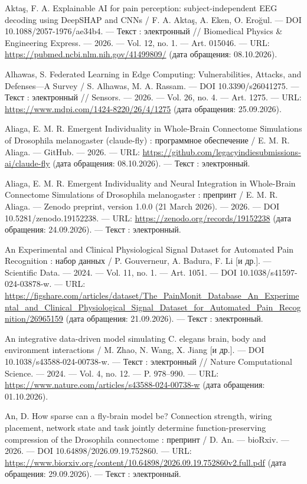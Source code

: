 \begin{list}{}{\setlength{\leftmargin}{10mm}\setlength{\labelwidth}{8mm}\setlength{\labelsep}{2mm}\setlength{\itemsep}{0pt}\setlength{\parsep}{0pt}\setlength{\topsep}{0pt}}
\item[28.] Aktaş, F. A. Explainable AI for pain perception: subject-independent EEG decoding using DeepSHAP and CNNs / F. A. Aktaş, A. Eken, O. Eroğul. — DOI 10.1088/2057-1976/ae34b4. — Текст : электронный // Biomedical Physics \& Engineering Express. — 2026. — Vol. 12, no. 1. — Art. 015046. — URL: \url{https://pubmed.ncbi.nlm.nih.gov/41499809/} (дата обращения: 08.10.2026).
\item[29.] Alhawas, S. Federated Learning in Edge Computing: Vulnerabilities, Attacks, and Defenses—A Survey / S. Alhawas, M. A. Rassam. — DOI 10.3390/s26041275. — Текст : электронный // Sensors. — 2026. — Vol. 26, no. 4. — Art. 1275. — URL: \url{https://www.mdpi.com/1424-8220/26/4/1275} (дата обращения: 25.09.2026).
\item[30.] Aliaga, E. M. R. Emergent Individuality in Whole-Brain Connectome Simulations of Drosophila melanogaster (claude-fly) : программное обеспечение / E. M. R. Aliaga. — GitHub. — 2026. — URL: \url{https://github.com/legacyindiesubmissions-ai/claude-fly} (дата обращения: 08.10.2026). — Текст : электронный.
\item[31.] Aliaga, E. M. R. Emergent Individuality and Neural Integration in Whole-Brain Connectome Simulations of Drosophila melanogaster : препринт / E. M. R. Aliaga. — Zenodo preprint, version 1.0.0 (21 March 2026). — 2026. — DOI 10.5281/zenodo.19152238. — URL: \url{https://zenodo.org/records/19152238} (дата обращения: 24.09.2026). — Текст : электронный.
\item[32.] An Experimental and Clinical Physiological Signal Dataset for Automated Pain Recognition : набор данных / P. Gouverneur, A. Badura, F. Li [и др.]. — Scientific Data. — 2024. — Vol. 11, no. 1. — Art. 1051. — DOI 10.1038/s41597-024-03878-w. — URL: \url{https://figshare.com/articles/dataset/The\_PainMonit\_Database\_An\_Experimental\_and\_Clinical\_Physiological\_Signal\_Dataset\_for\_Automated\_Pain\_Recognition/26965159} (дата обращения: 21.09.2026). — Текст : электронный.
\item[33.] An integrative data-driven model simulating C. elegans brain, body and environment interactions / M. Zhao, N. Wang, X. Jiang [и др.]. — DOI 10.1038/s43588-024-00738-w. — Текст : электронный // Nature Computational Science. — 2024. — Vol. 4, no. 12. — P. 978–990. — URL: \url{https://www.nature.com/articles/s43588-024-00738-w} (дата обращения: 01.10.2026).
\item[34.] An, D. How sparse can a fly-brain model be? Connection strength, wiring placement, network state and task jointly determine function-preserving compression of the Drosophila connectome : препринт / D. An. — bioRxiv. — 2026. — DOI 10.64898/2026.09.19.752860. — URL: \url{https://www.biorxiv.org/content/10.64898/2026.09.19.752860v2.full.pdf} (дата обращения: 29.09.2026). — Текст : электронный.

\end{list}
